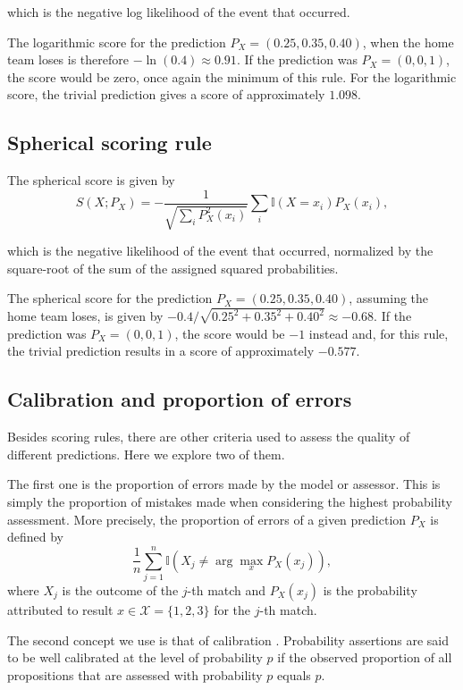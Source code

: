 \documentclass[journal,article,accept,moreauthors,pdftex,12pt,a4paper]{mdpi}
\begin{document}
\noindent
which is the negative log likelihood of the event that occurred.

The logarithmic score for the prediction $P_X=(0.25,0.35,0.40)$, when the home team loses is therefore 
$-\ln(0.4)\approx 0.91$. 
If the prediction was $P_X=(0,0,1)$, the score would be zero, once again the minimum of this rule.
For the logarithmic score, the trivial prediction gives a score of approximately $1.098$.

\subsection{Spherical scoring rule}

The spherical score is given by
$$S(X;P_X)=- \frac{1}{\sqrt{\sum_i P_X^2(x_i)}}\sum_{i}\mathbb{I}(X=x_i)P_X(x_i),$$

\noindent
which is the negative likelihood of the event that occurred, normalized by the square-root of the sum of the assigned squared probabilities.

The spherical score for the prediction $P_X=(0.25,0.35,0.40)$, assuming the home team loses, is given by
$-0.4/\sqrt{0.25^2+0.35^2+0.40^2} \approx -0.68$.
If the prediction was $P_X=(0,0,1)$, the score would be $-1$ instead and, for this rule, the trivial prediction results in a score of approximately $-0.577$.

\subsection{Calibration and proportion of errors}
\label{sec::calib}

Besides scoring rules, there are other criteria used to assess the quality of different predictions. Here we explore two of them.

The first one is the proportion of errors made by the model or assessor. This is simply the proportion of mistakes made when considering the highest probability assessment.
More precisely, the proportion of errors of a given prediction $P_X$ is defined by
$$\frac{1}{n}\sum_{j=1}^n \mathbb{I}\left(X_j \neq \arg \max_{x} P_X(x_{j})\right),$$
where $X_j$ is the outcome of the $j$-th match and $P_X(x_{j})$ is the probability attributed to result $x\in\mathcal{X}=\{1,2,3\}$ for the $j$-th match.

The second concept we use is that of calibration \cite{Dawid}. Probability assertions are said to be well calibrated at the level of probability $p$ if the observed proportion of all propositions that are assessed with probability $p$ equals $p$.
\end{document}
